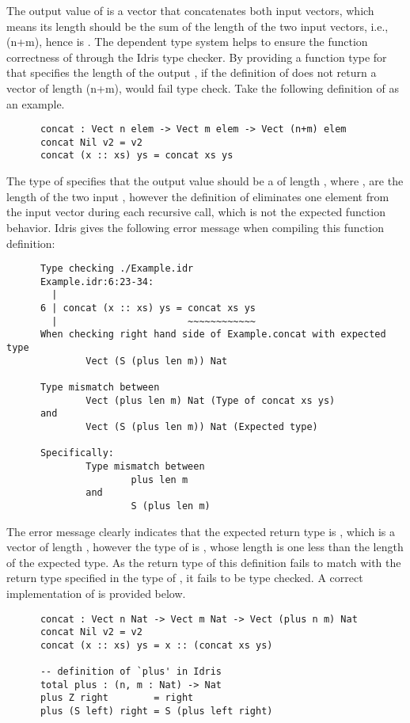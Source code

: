 The output value of  is a vector that concatenates both input vectors, which means its length should be the sum of the length of the two input vectors, i.e., (n+m), hence  is . The dependent type system helps to ensure the function correctness of  through the Idris type checker. By providing a function type for  that specifies the length of the output , if the definition of  does not return a vector of length (n+m),  would fail type check. Take the following definition of  as an example. 
\begin{lstlisting}
      concat : Vect n elem -> Vect m elem -> Vect (n+m) elem
      concat Nil v2 = v2
      concat (x :: xs) ys = concat xs ys
\end{lstlisting}

The type of  specifies that the output value should be a  of length , where ,  are the length of the two input , however the definition of  eliminates one element from the input vector  during each recursive call, which is not the expected function behavior. Idris gives the following error message when compiling this function definition: 
\begin{lstlisting}
      Type checking ./Example.idr
      Example.idr:6:23-34:
        |
      6 | concat (x :: xs) ys = concat xs ys
        |                       ~~~~~~~~~~~~
      When checking right hand side of Example.concat with expected type
              Vect (S (plus len m)) Nat

      Type mismatch between
              Vect (plus len m) Nat (Type of concat xs ys)
      and
              Vect (S (plus len m)) Nat (Expected type)

      Specifically:
              Type mismatch between
                      plus len m
              and
                      S (plus len m)
\end{lstlisting}

The error message clearly indicates that the expected return type is , which is a vector of length , however the type of  is , whose length is one less than the length of the expected type. As the return type of this definition fails to match with the return type specified in the type of , it fails to be type checked. A correct implementation of  is provided below. 
\begin{lstlisting}
      concat : Vect n Nat -> Vect m Nat -> Vect (plus n m) Nat
      concat Nil v2 = v2
      concat (x :: xs) ys = x :: (concat xs ys)

      -- definition of `plus' in Idris
      total plus : (n, m : Nat) -> Nat
      plus Z right        = right
      plus (S left) right = S (plus left right)
 \end{lstlisting}

